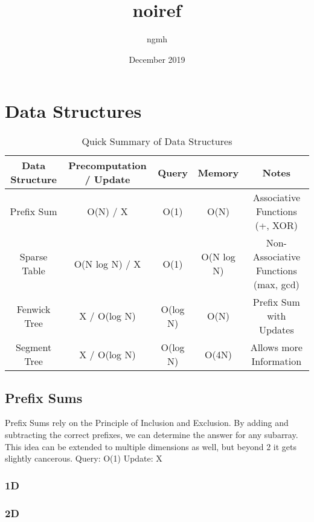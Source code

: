 \documentclass{article}
\title{noiref}
\author{ngmh}
\date{December 2019}
\begin{document}
\maketitle
\tableofcontents
\newpage

\section{Data Structures}
\begin{table}[H]
\begin{tabular}{|c|c|c|c|c|}
\hline
Data Structure & Precomputation / Update & Query    & Memory     & Notes                                \\ \hline
Prefix Sum     & O(N) / X                & O(1)     & O(N)       & Associative Functions (+, XOR)       \\ \hline
Sparse Table   & O(N log N) / X          & O(1)     & O(N log N) & Non-Associative Functions (max, gcd) \\ \hline
Fenwick Tree   & X / O(log N)            & O(log N) & O(N)       & Prefix Sum with Updates              \\ \hline
Segment Tree   & X / O(log N)            & O(log N) & O(4N)      & Allows more Information              \\ \hline
\end{tabular}
\caption{Quick Summary of Data Structures}
\label{tab:ds}
\end{table}

\subsection{Prefix Sums}
\begin{flushleft}
Prefix Sums rely on the Principle of Inclusion and Exclusion.
By adding and subtracting the correct prefixes, we can determine
the answer for any subarray.
\newline
This idea can be extended to multiple dimensions as well, but beyond 2
it gets slightly cancerous.
\newline
Query: O(1)
\newline
Update: X
\end{flushleft}

\subsubsection{1D}

\subsubsection{2D}

\end{document}
